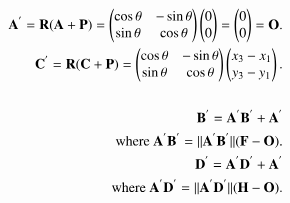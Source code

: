 \documentclass[journal,12pt,twocolumn]{IEEEtran}
\begin{document}
\begin{align}
\begin{split}
\mathbf{A^{'}} = \mathbf{R}(\mathbf{A+P})=\begin{pmatrix}\cos \theta & -\sin \theta\\\sin \theta & \cos \theta\end{pmatrix}\begin{pmatrix}0\\0\end{pmatrix} = \begin{pmatrix}0\\0\end{pmatrix} = \mathbf{O}.\\
\mathbf{C^{'}} = \mathbf{R}(\mathbf{C+P})=\begin{pmatrix}\cos \theta & -\sin \theta\\\sin \theta & \cos \theta\end{pmatrix}\begin{pmatrix}x_3-x_1\\y_3-y_1\end{pmatrix}.\\
\\
\mathbf{B^{'}}=\mathbf{A^{'}B^{'}}+\mathbf{A^{'}}\\
\text{where }
\mathbf{A^{'}B^{'}} = ||\mathbf{A^{'}B^{'}}||(\mathbf{F}-\mathbf{O}).\\
\mathbf{D^{'}}=\mathbf{A^{'}D^{'}}+\mathbf{A^{'}}\\
\text{where }
\mathbf{A^{'}D^{'}} = ||\mathbf{A^{'}D^{'}}||(\mathbf{H}-\mathbf{O}).
\end{split}
\end{align}
\end{document}
